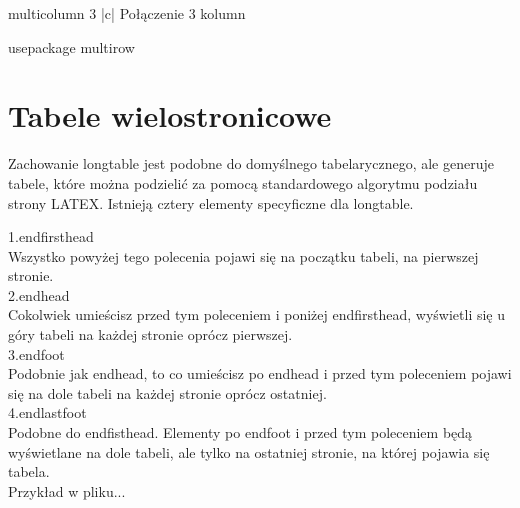 \documentclass[table]{beamer}
\begin{document}
\begin{frame}

 multicolumn  {3}  {|c|}  {Połączenie 3 kolumn}
 
 usepackage	{multirow}
\end{frame}

\section{Tabele wielostronicowe}
\begin{frame}[fragile]
 
Zachowanie longtable jest podobne do domyślnego tabelarycznego, ale generuje tabele, które można podzielić za pomocą standardowego algorytmu podziału strony LATEX. Istnieją cztery elementy specyficzne dla longtable.
\end{frame}

\begin{frame}

1.endfirsthead\\
Wszystko powyżej tego polecenia pojawi się na początku tabeli, na pierwszej stronie.\\

2.endhead\\
Cokolwiek umieścisz przed tym poleceniem i poniżej endfirsthead, wyświetli się u góry tabeli na każdej stronie oprócz pierwszej.\\

3.endfoot\\
Podobnie jak endhead, to co umieścisz po endhead i przed tym poleceniem pojawi się na dole tabeli na każdej stronie oprócz ostatniej.\\

4.endlastfoot\\
Podobne do endfisthead. Elementy po endfoot i przed tym poleceniem będą wyświetlane na dole tabeli, ale tylko na ostatniej stronie, na której pojawia się tabela.\\
Przykład w pliku...
\end{frame}
\end{document}
